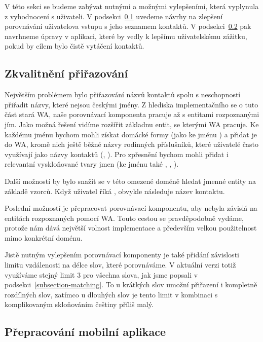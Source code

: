 V této sekci se budeme zabývat nutnými a možnými vylepšeními, která
vyplynula z vyhodnocení s uživateli. V podsekci~\ref{better-match}
uvedeme návrhy na zlepšení porovnávání uživatelova vstupu s jeho
seznamem kontaktů. V podsekci~\ref{better-app} pak navrhneme
úpravy v aplikaci, které by vedly k lepšímu uživatelskému
zážitku, pokud by cílem bylo čistě vytáčení kontaktů.

\subsection{Zkvalitnění přiřazování}\label{better-match}

Největším problémem bylo přiřazování názvů kontaktů spolu s neschopností přiřadit
názvy, které nejsou českými jmény. Z hlediska implementačního se o tuto část
stará WA, naše porovnávací komponenta pracuje až s entitami rozpoznanými jím.
Jako možná řešení vidíme rozšířit základnu entit, se kterými WA pracuje. Ke
každému jménu bychom mohli získat domácké formy (jako  ke jménu )
a přidat je do WA, kromě nich ještě běžné názvy rodinných příslušníků,
které uživatelé často využívají jako názvy kontaktů (, ).
Pro zpřesnění bychom mohli přidat i relevantní vyskloňované tvary jmen (ke jménu 
také , , ).

Další možností by bylo snažit se v této omezené doméně hledat jmenné entity na
základě vzorců. Když uživatel říká , obvykle následuje název
kontaktu.

Poslední možností je přepracovat porovnávací komponentu, aby nebyla závislá
na entitách rozpoznaných pomocí WA. Touto cestou se pravděpodobně vydáme,
protože nám dává největší volnost implementace a především velkou
použitelnost mimo konkrétní doménu.

Jistě nutným vylepšením porovnávací komponenty je také přidání závislosti
limitu vzdálenosti na délce slov, které porovnáváme. V aktuální verzi
totiž využíváme stejný limit 3 pro všechna slova, jak jsme popsali
v podsekci~\ref{subsection-matching}. To u krátkých slov umožní
přiřazení i kompletně rozdílných slov, zatímco u dlouhých
slov je tento limit v kombinaci s komplikovaným skloňováním češtiny
příliš malý.

\subsection{Přepracování mobilní aplikace}\label{better-app}

